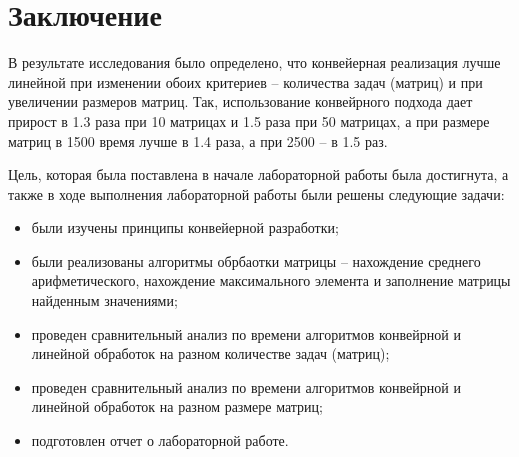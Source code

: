 \chapter*{Заключение}

В результате исследования было определено, что конвейерная реализация лучше линейной при изменении обоих критериев -- количества задач (матриц) и при увеличении размеров матриц. Так, использование конвейрного подхода дает прирост в 1.3 раза при 10 матрицах и 1.5 раза при 50 матрицах, а при размере матриц в 1500 время лучше в 1.4 раза, а при 2500 -- в 1.5 раз.

Цель, которая была поставлена в начале лабораторной работы была достигнута, а также в ходе выполнения лабораторной работы были решены следующие задачи:

\begin{itemize}
	\item были изучены принципы конвейерной разработки;
    \item были реализованы алгоритмы обрбаотки матрицы -- нахождение среднего арифметического, нахождение максимального элемента и заполнение матрицы найденным значениями;
	\item проведен сравнительный анализ по времени алгоритмов конвейрной и линейной обработок на разном количестве задач (матриц);
	\item проведен сравнительный анализ по времени алгоритмов конвейрной и линейной обработок на разном размере матриц;
	\item подготовлен отчет о лабораторной работе.
\end{itemize}
